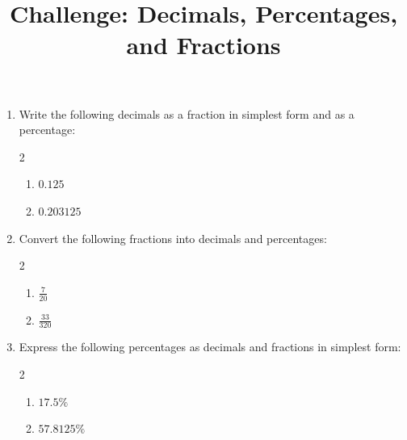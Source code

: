 \documentclass[12pt]{article}
\begin{document}

\title{Challenge: Decimals, Percentages, and Fractions}
\date{}
\maketitle

\begin{enumerate}[label=\textbf{Q\arabic*.}]


\vspace{-3em}

\item Write the following decimals as a fraction in simplest form and as a percentage:
\begin{multicols}{2}
\begin{enumerate}[label=(\alph*)]
    \item \( 0.125 \)
    \item \( 0.203125 \)
\end{enumerate}
\end{multicols}


\item Convert the following fractions into decimals and percentages:
\begin{multicols}{2}
\begin{enumerate}[label=(\alph*)]
    \item \( \frac{7}{20} \)
    \item \( \frac{33}{320} \)
\end{enumerate}
\end{multicols}

\item Express the following percentages as decimals and fractions in simplest form:
\begin{multicols}{2}
\begin{enumerate}[label=(\alph*)]
    \item \( 17.5\% \)
    \item \( 57.8125\% \)
\end{enumerate}
\end{multicols}

\end{enumerate}


\bigskip
\end{document}
